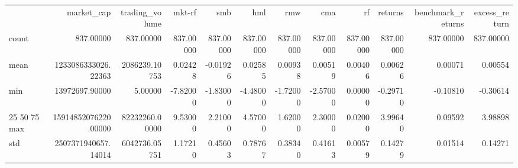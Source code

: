 \begin{tabular}{lrrrrrrrrrrr}
 & market_cap & trading_volume & mkt-rf & smb & hml & rmw & cma & rf & returns & benchmark_returns & excess_return \\
count & 837.00000 & 837.00000 & 837.00000 & 837.00000 & 837.00000 & 837.00000 & 837.00000 & 837.00000 & 837.00000 & 837.00000 & 837.00000 \\
mean & 1233086333026.22363 & 2086239.10753 & 0.02428 & -0.01926 & 0.02585 & 0.00938 & 0.00519 & 0.00406 & 0.00626 & 0.00071 & 0.00554 \\
min & 13972697.90000 & 5.00000 & -7.82000 & -1.83000 & -4.48000 & -1.72000 & -2.57000 & 0.00000 & -0.29710 & -0.10810 & -0.30614 \\
25%
50%
75%
max & 15914852076220.00000 & 82232260.00000 & 9.53000 & 2.21000 & 4.57000 & 1.62000 & 2.30000 & 0.02000 & 3.99640 & 0.09592 & 3.98898 \\
std & 2507371940657.14014 & 6042736.05751 & 1.17210 & 0.45603 & 0.78767 & 0.38340 & 0.41613 & 0.00579 & 0.14279 & 0.01514 & 0.14271 \\
\end{tabular}
